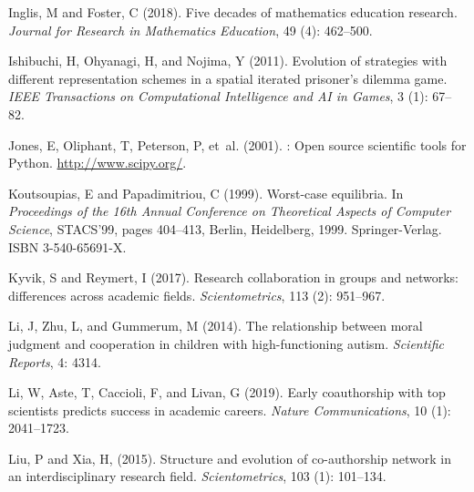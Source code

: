\documentclass{article}
\theoremstyle{definition}
\begin{document}
\begin{thebibliography}{71}
    Inglis, M and Foster, C (2018).
    \newblock Five decades of mathematics education research.
    \newblock \emph{Journal for Research in Mathematics Education}, 49
      (4): 462--500.
    
    Ishibuchi, H, Ohyanagi, H, and Nojima, Y (2011).
    \newblock Evolution of strategies with different representation schemes in a
      spatial iterated prisoner's dilemma game.
    \newblock \emph{IEEE Transactions on Computational Intelligence and AI in
      Games}, 3 (1): 67--82.
    
    Jones, E, Oliphant, T, Peterson, P, et~al. (2001).
    : Open source scientific tools for {Python}.
    \newblock \url{http://www.scipy.org/}.
    
    Koutsoupias, E and Papadimitriou, C (1999).
    \newblock Worst-case equilibria.
    \newblock In \emph{Proceedings of the 16th Annual Conference on Theoretical
      Aspects of Computer Science}, STACS'99, pages 404--413, Berlin, Heidelberg,
      1999. Springer-Verlag.
    \newblock ISBN 3-540-65691-X.
    
    Kyvik, S and Reymert, I (2017).
    \newblock Research collaboration in groups and networks: differences across
      academic fields.
    \newblock \emph{Scientometrics}, 113 (2): 951--967.
    
    Li, J, Zhu, L, and Gummerum, M (2014).
    \newblock The relationship between moral judgment and cooperation in children
      with high-functioning autism.
    \newblock \emph{Scientific Reports}, 4: 4314.
    
    Li, W, Aste, T, Caccioli, F, and Livan, G (2019).
    \newblock Early coauthorship with top scientists predicts success in academic
      careers.
    \newblock \emph{Nature Communications}, 10 (1): 2041--1723.
    
    Liu, P and Xia, H, (2015).
    \newblock Structure and evolution of co-authorship network in an
      interdisciplinary research field.
    \newblock \emph{Scientometrics}, 103 (1): 101--134.
    

\end{thebibliography}
\end{document}
